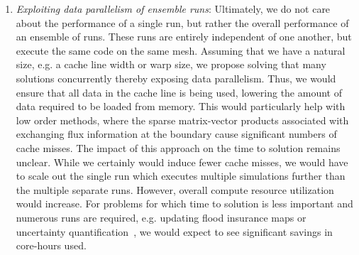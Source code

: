 \begin{enumerate}
\item {\em Exploiting data parallelism of ensemble runs}: Ultimately, we do not care about the performance of a single run, but rather the overall performance of an ensemble of runs. These runs are entirely independent of one another, but execute the same code on the same mesh. Assuming that we have a natural size, e.g. a cache line width or warp size, we propose solving that many solutions concurrently thereby exposing data parallelism. Thus, we would ensure that all data in the cache line is being used, lowering the amount of data required to be loaded from memory. This would particularly help with low order methods, where the sparse matrix-vector products associated with exchanging flux information at the boundary cause significant numbers of cache misses. The impact of this approach on the time to solution remains unclear. While we certainly would induce fewer cache misses, we would have to scale out the single run which executes multiple simulations further than the multiple separate runs.  However, overall compute resource utilization would increase. For problems for which time to solution is less important and numerous runs are required, e.g. updating flood insurance maps or uncertainty quantification~\cite{Lindley}, we would expect to see significant savings in core-hours used.
\end{enumerate}



